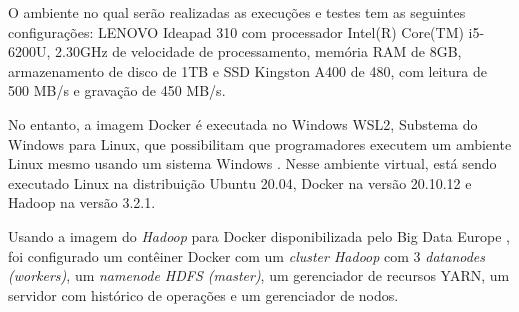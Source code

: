 O ambiente no qual serão realizadas as execuções e testes tem as seguintes configurações: LENOVO Ideapad 310 com processador Intel(R) Core(TM) i5-6200U, 2.30GHz de velocidade de processamento,  memória RAM de 8GB, armazenamento de disco de 1TB e SSD Kingston A400 de 480, com leitura de 500 MB/s e gravação de 450 MB/s. 

No entanto, a imagem Docker é executada no Windows WSL2, Substema do Windows para Linux, que possibilitam que programadores executem um ambiente Linux mesmo usando um sistema Windows \cite{MicrosoftWSL22}. Nesse ambiente virtual, está sendo executado Linux na distribuição Ubuntu 20.04, Docker na versão 20.10.12 e Hadoop na versão 3.2.1.

Usando a imagem do \textit{Hadoop} para Docker disponibilizada pelo Big Data Europe \cite{BigDataHadoopGithub}, foi configurado um contêiner Docker com um \textit{cluster Hadoop} com 3 \textit{datanodes (workers)}, um \textit{namenode HDFS (master)}, um gerenciador de recursos YARN, um servidor com histórico de operações e um gerenciador de nodos.
